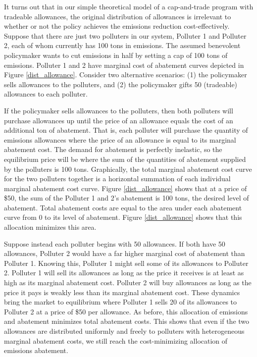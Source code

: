 It turns out that in our simple theoretical model of a cap-and-trade program with tradeable allowances, the original distribution of allowances is irrelevant to whether or not the policy achieves the emissions reduction cost-effectively. Suppose that there are just two polluters in our system, Polluter 1 and Polluter 2, each of whom currently has 100 tons in emissions. The assumed benevolent policymaker wants to cut emissions in half by setting a cap of 100 tons of emissions. Polluter 1 and 2 have marginal cost of abatement curves depicted in Figure \ref{dist_allowance}. Consider two alternative scenarios: (1) the policymaker sells allowances to the polluters, and (2) the policymaker gifts 50 (tradeable) allowances to each polluter. 

If the policymaker sells allowances to the polluters, then both polluters will purchase allowances up until the price of an allowance equals the cost of an additional ton of abatement. That is, each polluter will purchase the quantity of emissions allowances where the price of an allowance is equal to its marginal abatement cost. The demand for abatement is perfectly inelastic, so the equilibrium price will be where the sum of the quantities of abatement supplied by the polluters is 100 tons. Graphically, the total marginal abatement cost curve for the two polluters together is a horizontal summation of each individual marginal abatement cost curve. Figure \ref{dist_allowance} shows that at a price of \$50, the sum of the Polluter 1 and 2's abatement is 100 tons, the desired level of abatement. Total abatement costs are equal to the area under each abatement curve from 0 to its level of abatement. Figure \ref{dist_allowance} shows that this allocation minimizes this area. 

Suppose instead each polluter begins with 50 allowances. If both have 50 allowances, Polluter 2 would have a far higher marginal cost of abatement than Polluter 1. Knowing this, Polluter 1 might sell some of its allowances to Polluter 2. Polluter 1 will sell its allowances as long as the price it receives is at least as high as its marginal abatement cost. Polluter 2 will buy allowances as long as the price it pays is weakly less than its marginal abatement cost. These dynamics bring the market to equilibrium where Polluter 1 sells 20 of its allowances to Polluter 2 at a price of \$50 per allowance. As before, this allocation of emissions and abatement minimizes total abatement costs. This shows that even if the two allowances are distributed uniformly and freely to polluters with heterogeneous marginal abatement costs, we still reach the cost-minimizing allocation of emissions abatement. 

